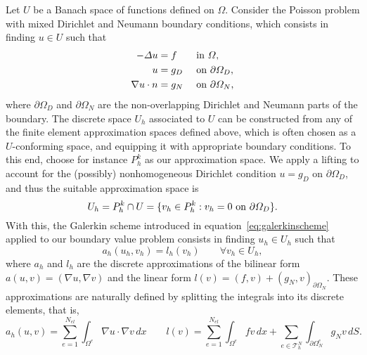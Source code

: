 Let $U$ be a Banach space of functions defined on $\Omega$. Consider the Poisson problem with mixed Dirichlet and Neumann boundary conditions, which consists in finding $u\in U$ such that
\begin{equation}
    \begin{aligned}
        -\Delta u &= f && \text{ in } \Omega, \\
        u &= g_D && \text{ on } \partial\Omega_D, \\
        \nabla u \cdot n &= g_N && \text{ on } \partial\Omega_N,
    \end{aligned}
\end{equation}
where $\partial\Omega_D$ and $\partial\Omega_N$ are the non-overlapping Dirichlet and Neumann parts of the boundary. The discrete space $U_h$ associated to $U$ can be constructed from any of the finite element approximation spaces defined above, which is often chosen as a $U$-conforming space, and equipping it with appropriate boundary conditions. To this end, choose for instance $P_h^k$ as our approximation space. We apply a lifting to account for the (possibly) nonhomogeneous Dirichlet condition $u=g_D$ on $\partial\Omega_D$, and thus the suitable approximation space is
\begin{equation}
    U_h = P_h^k \cap U = \{v_h\in P_h^k: v_h = 0 \text{ on } \partial\Omega_D\}.
\end{equation}
With this, the Galerkin scheme introduced in equation~\ref{eq:galerkinscheme} applied to our boundary value problem consists in finding $u_h \in U_h$ such that 
\begin{equation}
    a_h(u_h, v_h) = l_h(v_h) \qquad \forall v_h \in U_h,
\end{equation}
where $a_h$ and $l_h$ are the discrete approximations of the bilinear form $a(u,v)=(\nabla u, \nabla v)$ and the linear form $l(v) = (f,v) + (g_N, v)_{\partial\Omega_N}$. These approximations are naturally defined by splitting the integrals into its discrete elements, that is, 
\begin{equation}
    a_h(u,v) = \sum_{e=1}^{N_{el}} \int_{\Omega^e} \nabla u \cdot \nabla v \, dx \qquad l(v) = \sum_{e=1}^{N_{el}} \int_{\Omega^e} f v \, dx + \sum_{e \in \mathcal{T}_h^N} \int_{\partial\Omega_N^e} g_N v \, dS.
\end{equation}

